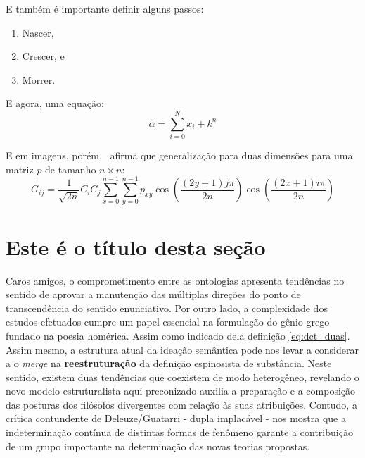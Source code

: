 \documentclass[font=plain,chapter=TITLE,section=Title,espaco=duplo,tocpage=plain,appendix=Name,floatnumber=continuous]{abnt}
\begin{document}
E também é importante definir alguns passos:
\begin{enumerate}
  \item Nascer,
  \item Crescer, e
  \item Morrer.
\end{enumerate}

%
%
%
E agora, uma equação:
\begin{equation}
\alpha = \sum_{i=0}^{N}{x_i + k^n}
\end{equation}

E em imagens, porém,~\cite{semolini2002support} afirma que generalização
para duas dimensões para uma matriz $p$ de tamanho $n \times n$:
\begin{equation}
G_{ij} = \frac{1}{\sqrt{2n}} C_i C_j \sum_{x=0}^{n-1} \sum_{y=0}^{n-1}
         p_{xy} \cos{ \left ( \frac{(2y + 1) j \pi}{2n} \right ) }
              \cos{ \left ( \frac{(2x + 1) i \pi}{2n} \right ) }
\label{eq:dct_duas}
\end{equation}

%
%
\section{Este é o título desta seção}

Caros amigos, o comprometimento entre as ontologias apresenta tendências no
sentido de aprovar a manutenção das múltiplas direções do ponto de
transcendência do sentido enunciativo. Por outro lado, a complexidade dos
estudos efetuados cumpre um papel essencial na formulação do gênio grego
fundado na poesia homérica. Assim como indicado dela definição
\ref{eq:dct_duas}.  Assim mesmo, a estrutura atual da ideação semântica
pode nos levar a considerar a o \textit{merge} na \textbf{reestruturação}
da definição espinosista de substância. Neste sentido, existem duas
tendências que coexistem de modo heterogêneo, revelando o novo modelo
estruturalista aqui preconizado auxilia a preparação e a composição das
posturas dos filósofos divergentes com relação às suas atribuições.
Contudo, a crítica contundente de Deleuze/Guatarri - dupla implacável - nos
mostra que a indeterminação contínua de distintas formas de fenômeno
garante a contribuição de um grupo importante na determinação das novas
teorias propostas.
\end{document}
